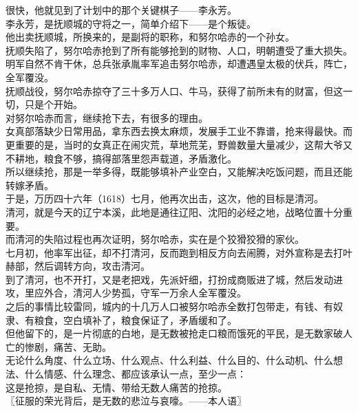 \begin{multicols}{\theparacolNo}
很快，他就见到了计划中的那个关键棋子——李永芳。\\

李永芳，是抚顺城的守将之一，简单介绍下——是个叛徒。\\

他出卖抚顺城，所换来的，是副将的职称，和努尔哈赤的一个孙女。\\

抚顺失陷了，努尔哈赤抢到了所有能够抢到的财物、人口，明朝遭受了重大损失。\\

明军自然不肯干休，总兵张承胤率军追击努尔哈赤，却遭遇皇太极的伏兵，阵亡，全军覆没。\\

抚顺战役，努尔哈赤掠夺了三十多万人口、牛马，获得了前所未有的财富，但这一切，只是个开始。\\

对努尔哈赤而言，继续抢下去，有很多的理由。\\

女真部落缺少日常用品，拿东西去换太麻烦，发展手工业不靠谱，抢来得最快。而更重要的是，当时的女真正在闹灾荒，草地荒芜，野兽数量大量减少，这帮大爷又不耕地，粮食不够，搞得部落里怨声载道，矛盾激化。\\

所以继续抢，那是一举多得，既能够填补产业空白，又能解决吃饭问题，而且还能转嫁矛盾。\\

于是，万历四十六年（1618）七月，他再次出击，这次，他的目标是清河。\\

清河，就是今天的辽宁本溪，此地是通往辽阳、沈阳的必经之地，战略位置十分重要。\\

而清河的失陷过程也再次证明，努尔哈赤，实在是个狡猾狡猾的家伙。\\

七月初，他率军出征，却不打清河，反而跑到相反方向去闹腾，对外宣称是去打叶赫部，然后调转方向，攻击清河。\\

到了清河，也不开打，又是老把戏，先派奸细，打扮成商贩进了城，然后发动进攻，里应外合，清河人少势孤，守军一万余人全军覆没。\\

之后的事情比较雷同，城内的十几万人口被努尔哈赤全数打包带走，有钱、有奴隶、有粮食，空白填补了，粮食保证了，矛盾缓和了。\\

但他留下的，是一片彻底的白地，是无数被抢走口粮而饿死的平民，是无数家破人亡的惨剧，痛苦、无助。\\

无论什么角度、什么立场、什么观点、什么利益、什么目的、什么动机、什么想法、什么情感、什么理念、都应该承认一点，至少一点：\\

这是抢掠，是自私、无情、带给无数人痛苦的抢掠。\\

〖征服的荣光背后，是无数的悲泣与哀嚎。——本人语〗\\
\ifnum{}
	\end{multicols}
\fi
\newpage
